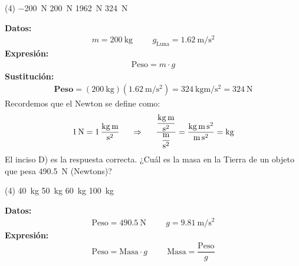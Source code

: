 \documentclass[12pt, letter]{exam}
\begin{document}
\begin{questions}
    \begin{tasks}(4)
        \task \SI{-200}{\newton}
        \task \SI{200}{\newton}
        \task \SI{1962}{\newton}
        \task \SI{324}{\newton}
    \end{tasks}
    \textbf{Datos:}
    \begin{align*}
    m =  \SI{200}{\kilo\gram} \hspace{1cm} g_{\text{Luna}} = \SI[per-mode=fraction]{1.62}{\meter\per\square\second}
    \end{align*}
    \textbf{Expresión:}
    \begin{align*}
    \text{Peso} = m \cdot g
    \end{align*}
    \textbf{Sustitución:}
    \begin{align*}
    \textbf{Peso} = \left( \SI{200}{\kilo\gram} \right) \left( \SI[per-mode=fraction]{1.62}{\meter\per\square\second} \right) = \SI[per-mode=fraction]{324}{\kilo\gram\meter\per\square\second} = \SI{324}{\newton}
    \end{align*}
    Recordemos que el Newton se define como:
    \begin{align*}
    \SI{1}{\newton} = \SI[per-mode=fraction]{1}{\kilo\gram\meter\per\square\second} \hspace{0.5cm} \Rightarrow \hspace{0.5cm} \dfrac{\displaystyle \unit[per-mode=fraction]{\kilo\gram\meter\per\square\second}}{\displaystyle \unit[per-mode=fraction]{\meter\per\square\second}} = \dfrac{\unit{\kilo\gram\meter\square\second}}{\unit{\meter\square\second}} = \unit{\kilo\gram}
    \end{align*}
    El inciso D) es la respuesta correcta.
    \question ¿Cuál es la masa en la Tierra de un objeto que pesa \SI{490.5}{\newton} (Newtons)?
    \begin{tasks}(4)
        \task \SI{40}{\kilo\gram}
        \task \SI{50}{\kilo\gram}
        \task \SI{60}{\kilo\gram}
        \task \SI{100}{\kilo\gram}
    \end{tasks}
    \textbf{Datos:}
    \begin{align*}
    \text{Peso} = \SI{490.5}{\newton} \hspace{1cm} g = \SI{9.81}{\meter\per\square\second}
    \end{align*}
    \textbf{Expresión:}
    \begin{align*}
    \text{Peso} = \text{Masa} \cdot g \hspace{1cm} \text{Masa} = \dfrac{\text{Peso}}{g}
    \end{align*}

\end{questions}
\end{document}
